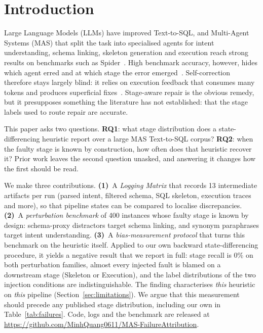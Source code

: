 \documentclass{llncs}
\begin{document}
\section{Introduction}
\label{sec:intro}

Large Language Models (LLMs) have improved Text-to-SQL, and Multi-Agent
Systems (MAS) that split the task into specialised agents for intent
understanding, schema linking, skeleton generation and execution reach strong
results on benchmarks such as Spider~\cite{yu_spider_2018}. High benchmark
accuracy, however, hides which agent erred and at which stage the error
emerged~\cite{huo_bird_interact_2026,zhu_scot2s_2025}. Self-correction
therefore stays largely blind: it relies on execution feedback that consumes
many tokens and produces superficial fixes~\cite{zhu_scot2s_2025}. Stage-aware
repair is the obvious remedy, but it presupposes something the literature has
not established: that the stage labels used to route repair are accurate.

This paper asks two questions. \textbf{RQ1}: what stage distribution does a
state-differencing heuristic report over a large MAS Text-to-SQL corpus?
\textbf{RQ2}: when the faulty stage is known by construction, how often does
that heuristic recover it? Prior work leaves the second question unasked, and
answering it changes how the first should be read.

We make three contributions. \textbf{(1)}~A \emph{Logging Matrix} that records
13 intermediate artifacts per run (parsed intent, filtered schema, SQL
skeleton, execution traces and more), so that pipeline states can be compared
to localise discrepancies. \textbf{(2)}~A \emph{perturbation benchmark} of 400
instances whose faulty stage is known by design: schema-proxy distractors
target schema linking, and synonym paraphrases target intent understanding.
\textbf{(3)}~A \emph{bias-measurement protocol} that turns this benchmark on
the heuristic itself. Applied to our own backward state-differencing
procedure, it yields a negative result that we report in full: stage recall is
$0\%$ on both perturbation families, almost every injected fault is blamed on
a downstream stage (Skeleton or Execution), and the label distributions of the
two injection conditions are indistinguishable. The finding characterises
\emph{this} heuristic on \emph{this} pipeline (Section~\ref{sec:limitations}).
We argue that this measurement should precede any published stage
distribution, including our own in Table~\ref{tab:failures}. Code, logs and
the benchmark are released at
\url{https://github.com/MinhQuang0611/MAS-FailureAttribution}.
\end{document}
